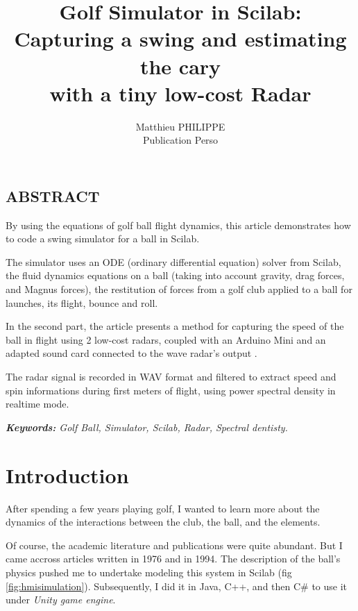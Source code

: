 \documentclass[10pt,a4paper]{report}
\author{Matthieu PHILIPPE\\Publication Perso}
\title{\textbf{Golf Simulator in Scilab:\\Capturing a swing and estimating the cary\\with a tiny low-cost  Radar}}
\begin{document}
\sffamily

\rmfamily\maketitle\sffamily
\tableofcontents
\listoffigures
\listoftables
\lstlistoflistings
\listofmyequations
\listofmyremarks
\listofmydefinitions

\newpage
\pagestyle{plainstar}
\section*{ABSTRACT}\setcounter{page}{1}
By using the equations of golf ball flight dynamics, this article demonstrates how to code a swing simulator for a 
ball in Scilab.

The simulator uses an ODE (ordinary differential equation) solver from Scilab, the fluid dynamics equations on a 
ball (taking into account gravity, drag forces, and Magnus forces), the restitution of forces from a golf club 
applied to a ball for launches, its  flight, bounce and roll. 

In the second part, the article presents a method for capturing the speed of the ball in flight using 2 low-cost 
radars, coupled with an Arduino Mini and an adapted sound card connected to the wave radar's output . 

The radar signal is recorded in WAV format and filtered to extract speed and spin informations during first meters of flight, 
using power spectral density in realtime mode.

\emph{\textbf{Keywords:} Golf Ball, Simulator, Scilab, Radar, Spectral dentisty.}

\chapter{Introduction}
After spending a few years playing golf, I wanted to learn more about the dynamics of the interactions between 
the club, the ball, and the elements. 

Of course, the academic literature and publications were quite abundant. But I came accross articles \cite{PWBJKH76} 
written in 1976 and \cite{SASDR94} in 1994. The description of the ball's physics pushed me to undertake modeling 
this system in Scilab (fig \ref{fig:hmisimulation}). Subsequently, I did it in Java, C++, and then C\# to use it 
under \emph{Unity game engine}{\textregistered \texttrademark}.
\end{document}
